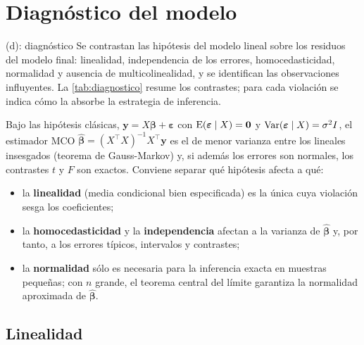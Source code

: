 \chapter{Diagnóstico del modelo}\label{cap:diagnostico}

\begin{entregable}{(d): diagnóstico}
Se contrastan las hipótesis del modelo lineal sobre los residuos del modelo final: linealidad,
independencia de los errores, homocedasticidad, normalidad y ausencia de multicolinealidad, y se
identifican las observaciones influyentes. La \cref{tab:diagnostico} resume los contrastes; para
cada violación se indica cómo la absorbe la estrategia de inferencia.
\end{entregable}

Bajo las hipótesis clásicas, $\mathbf y=X\boldsymbol\beta+\boldsymbol\varepsilon$ con
$\operatorname{E}(\boldsymbol\varepsilon\mid X)=\mathbf 0$ y $\operatorname{Var}(\boldsymbol\varepsilon\mid X)=\sigma^2 I$, el
estimador MCO $\hat{\boldsymbol\beta}=(X^{\top}X)^{-1}X^{\top}\mathbf y$ es el de menor varianza
entre los lineales insesgados (teorema de Gauss-Markov) y, si además los errores son normales, los
contrastes $t$ y $F$ son exactos. Conviene separar qué hipótesis afecta a qué:
\begin{itemize}
  \item la \textbf{linealidad} (media condicional bien especificada) es la única cuya violación
  sesga los coeficientes;
  \item la \textbf{homocedasticidad} y la \textbf{independencia} afectan a la varianza de
  $\hat{\boldsymbol\beta}$ y, por tanto, a los errores típicos, intervalos y contrastes;
  \item la \textbf{normalidad} sólo es necesaria para la inferencia exacta en muestras pequeñas;
  con $n$ grande, el teorema central del límite garantiza la normalidad aproximada de
  $\hat{\boldsymbol\beta}$.
\end{itemize}




\section{Linealidad}

